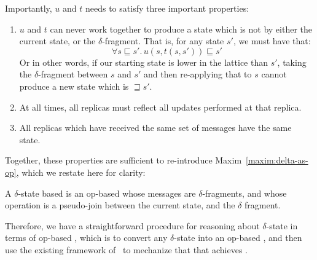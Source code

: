 Importantly, $u$ and $t$ needs to satisfy three important properties:
\begin{enumerate}
  \item $u$ and $t$ can never work together to produce a state which is not
    by either the current state, or the $\delta$-fragment. That is, for any
    state $s'$, we must have that:
    \[
      \forall s \sqsubseteq s'.\, u(s, t(s, s')) \sqsubseteq s'
    \]
    Or in other words, if our starting state is lower in the lattice than $s'$,
    taking the $\delta$-fragment between $s$ and $s'$ and then re-applying that
    to $s$ cannot produce a new state which is $\sqsupseteq s'$.
  \item At all times, all replicas must reflect all updates performed at that
    replica.
  \item All replicas which have received the same set of messages have the same
    state.
\end{enumerate}

Together, these properties are sufficient to re-introduce
Maxim~\ref{maxim:delta-as-op}, which we restate here for clarity:
\setcounter{maxim}{1}
\begin{maxim}
  A $\delta$-state based \CRDT is an op-based \CRDT whose messages are
  $\delta$-fragments, and whose operation is a pseudo-join between the current
  state, and the $\delta$ fragment.
\end{maxim}

Therefore, we have a straightforward procedure for reasoning about
$\delta$-state \CRDTs in terms of op-based \CRDTs, which is to convert any
$\delta$-state \CRDT into an op-based \CRDT, and then use the existing framework
of~\citet{gomes17} to mechanize that that \CRDT achieves \SEC.
